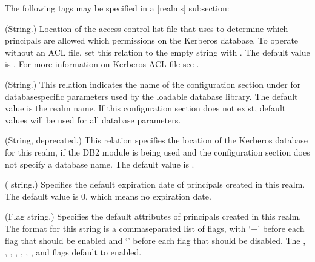 \documentclass[letterpaper,10pt,english]{sphinxmanual}
\begin{document}
\sphinxAtStartPar
The following tags may be specified in a {[}realms{]} subsection:
\begin{description}
\sphinxAtStartPar
(String.)  Location of the access control list file that
{\hyperref[\detokenize{admin/admin_commands/kadmind:kadmind-8}]{}} uses to determine which principals are allowed
which permissions on the Kerberos database.  To operate without an
ACL file, set this relation to the empty string with .  The default value is {\hyperref[\detokenize{mitK5defaults:paths}]{}}.  For more
information on Kerberos ACL file see {\hyperref[\detokenize{admin/conf_files/kadm5_acl:kadm5-acl-5}]{}}.

\sphinxAtStartPar
(String.)  This relation indicates the name of the configuration
section under {\hyperref[\detokenize{admin/conf_files/kdc_conf:dbmodules}]{}} for database\sphinxhyphen{}specific parameters
used by the loadable database library.  The default value is the
realm name.  If this configuration section does not exist, default
values will be used for all database parameters.

\sphinxAtStartPar
(String, deprecated.)  This relation specifies the location of the
Kerberos database for this realm, if the DB2 module is being used
and the {\hyperref[\detokenize{admin/conf_files/kdc_conf:dbmodules}]{}} configuration section does not specify a
database name.  The default value is {\hyperref[\detokenize{mitK5defaults:paths}]{}}.

\sphinxAtStartPar
( string.)  Specifies the default expiration date of
principals created in this realm.  The default value is 0, which
means no expiration date.

\sphinxAtStartPar
(Flag string.)  Specifies the default attributes of principals
created in this realm.  The format for this string is a
comma\sphinxhyphen{}separated list of flags, with ‘+’ before each flag that
should be enabled and ‘\sphinxhyphen{}’ before each flag that should be
disabled.  The , , ,
, , , , and
 flags default to enabled.


\end{description}
\end{document}
